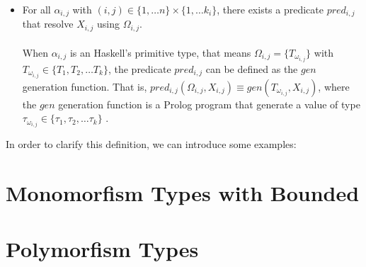 \documentclass{report}
\theoremstyle{definition}
\newtheorem{example}{Example}[section]
\theoremstyle{definition}
\newcommand{\ttt}[1]{\texttt{#1}}
\begin{document}
\begin{itemize}
\begin{example}
\begin{itemize}
			\item As $\; \ttt{Weird} \;$ constructor requires both types \ttt{SomethingWeird Int String Bool} and  \ttt{String}, that is, $a_{3,1} = \ttt{SomethingWeird Int String Bool}$ and $a_{3,2} = \ttt{String}$, therefore $\Omega_{3,1} = \{\ttt{int}, \ttt{string}, \ttt{bool}\} \subseteq \{\ttt{int}, \ttt{string}, \ttt{bool}\}$ and $\Omega_{3,2} = \{\ttt{string}\} \subset \{\ttt{int}, \ttt{string}, \ttt{bool}\}$.
		\end{itemize}
	\end{example}
	\item For all $\alpha_{i,j}$ with $(i,j) \in \{1, \ldots n \} \times \{1, \ldots k_i \}$, there exists a predicate $pred_{i,j}$ that resolve $X_{i,j}$ using $\Omega_{i,j}$.\\\\
	When $\alpha_{i,j}$ is an Haskell's primitive type, that means $\Omega_{i,j} = \{T_{\omega_{i,j}}\}$ with $T_{\omega_{i,j}} \in \{ T_1 , T_2, \ldots T_k \}$, the predicate $pred_{i,j}$ can be defined as the $gen$ generation function. That is, $pred_{i,j}(\Omega_{i,j}, X_{i,j}) \equiv gen(T_{\omega_{i,j}}, X_{i,j})$, where the $gen$ generation function is a Prolog program that generate a value of type $\tau_{\omega_{i,j}} \in \{ \tau_1 , \tau_2, \ldots \tau_k \}$ .

\end{itemize}
In order to clarify this definition, we can introduce some examples:


\section{Monomorfism Types with Bounded}

\section{Polymorfism Types}
\end{document}
